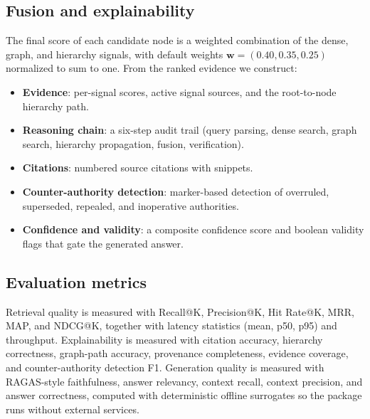 \subsection{Fusion and explainability}

The final score of each candidate node is a weighted combination of the dense,
graph, and hierarchy signals, with default weights $\mathbf{w} = (0.40, 0.35,
0.25)$ normalized to sum to one. From the ranked evidence we construct:

\begin{itemize}
  \item \textbf{Evidence}: per-signal scores, active signal sources, and the
        root-to-node hierarchy path.
  \item \textbf{Reasoning chain}: a six-step audit trail (query parsing, dense
        search, graph search, hierarchy propagation, fusion, verification).
  \item \textbf{Citations}: numbered source citations with snippets.
  \item \textbf{Counter-authority detection}: marker-based detection of
        overruled, superseded, repealed, and inoperative authorities.
  \item \textbf{Confidence and validity}: a composite confidence score and
        boolean validity flags that gate the generated answer.
\end{itemize}

\subsection{Evaluation metrics}

Retrieval quality is measured with Recall@K, Precision@K, Hit Rate@K, MRR,
MAP, and NDCG@K, together with latency statistics (mean, p50, p95) and
throughput. Explainability is measured with citation accuracy, hierarchy
correctness, graph-path accuracy, provenance completeness, evidence coverage,
and counter-authority detection F1. Generation quality is measured with
RAGAS-style \cite{es2024ragas} faithfulness, answer relevancy, context recall,
context precision, and answer correctness, computed with deterministic offline
surrogates so the package runs without external services.
